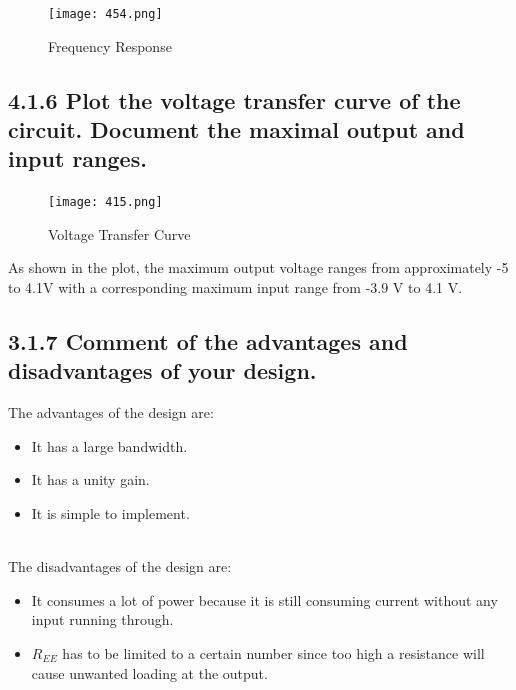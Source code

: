 \documentclass[12pt]{article}
\begin{document}
\begin{figure}[H]
    \centering
    \texttt{[image: 454.png]}
    \caption{Frequency Response}
\end{figure}

\subsection*{4.1.6 Plot the voltage transfer curve of the circuit. Document the maximal output and input ranges.}

\begin{figure}[H]
    \centering
    \texttt{[image: 415.png]}
    \caption{Voltage Transfer Curve}
\end{figure}

As shown in the plot, the maximum output voltage 
ranges from approximately -5 to 4.1V with a corresponding
maximum input range from -3.9 V to 4.1 V.

\subsection*{3.1.7 Comment of the advantages and disadvantages of your design.}

The advantages of the design are: 
\begin{itemize}
    \item It has a large bandwidth.
    \item It has a unity gain.
    \item It is simple to implement.
\end{itemize} \\

The disadvantages of the design are: 
\begin{itemize}
    \item It consumes a lot of power because it is still consuming current without any input running through.
    \item $R_{EE}$ has to be limited to a certain number since too high a resistance will cause unwanted loading at the output.
\end{itemize}
\end{document}
